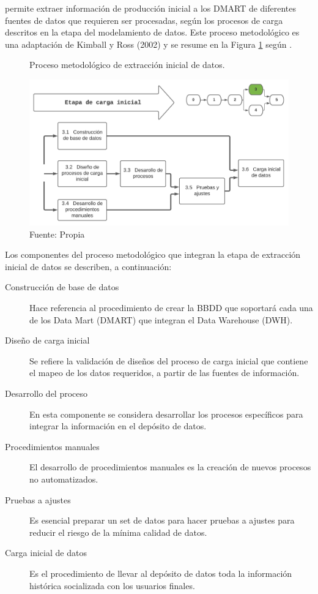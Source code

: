 \documentclass[12pt,jou]{apa7}
\begin{document}
permite extraer información de producción inicial a los DMART de diferentes fuentes de datos que requieren ser procesadas, según los procesos de carga descritos en la etapa del modelamiento de datos. Este proceso metodológico es una adaptación de Kimball y Ross (2002) y se resume en la Figura \ref{fig: etapa3} según \cite{LaPlata}.

\begin{figure}[h]
\caption{Proceso metodológico de extracción inicial de datos.}
\centering
\includegraphics[width=1\linewidth]{Figuras/etapa3}
\caption*{ Fuente: Propia}
\label{fig: etapa3}
\end{figure}

Los componentes del proceso metodológico que integran la etapa de extracción inicial de datos se describen, a continuación:
\begin{description}

\item[Construcción de base de datos] 
Hace referencia al procedimiento de crear la BBDD que soportará cada una de los Data Mart (DMART) que integran el Data Warehouse (DWH).

\item[Diseño de carga inicial] 	
Se refiere la validación de diseños del proceso de carga inicial que contiene el mapeo de los datos requeridos, a partir de las fuentes de información.

\item[Desarrollo del proceso] 
En esta componente se considera desarrollar los procesos específicos para integrar la información en el depósito de datos.

\item[Procedimientos manuales] 
El desarrollo de procedimientos manuales es la creación de nuevos procesos no
automatizados.

\item[Pruebas a ajustes] 
Es esencial preparar un set de datos para hacer pruebas a ajustes para reducir el riesgo de la mínima calidad de datos.

\item[Carga inicial de datos] 
Es el procedimiento de llevar al depósito de datos toda la información histórica socializada con los usuarios finales.	
\end{description}
\end{document}
